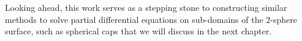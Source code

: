 Looking ahead, this work serves as a stepping stone to constructing similar methods to solve partial differential equations on sub-domains of the $2$-sphere surface, such as spherical caps that we will discuss in the next chapter.











  